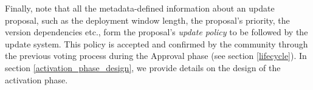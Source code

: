 Finally, note that all the metadata-defined information about an update 
proposal, such as the
deployment window length, the proposal's priority, the version dependencies
etc., form the proposal's \emph{update policy} to be followed by the update
system. This policy is accepted and confirmed by the community through the
previous voting process during the Approval phase (see section 
\ref{lifecycle}). In section \ref{activation_phase_design}, we provide details 
on the design of the activation phase.

